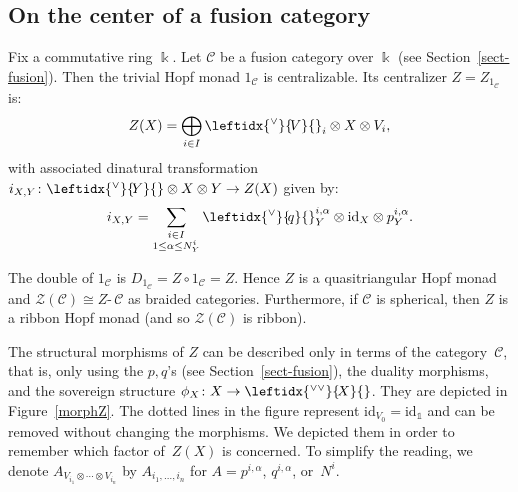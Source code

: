 \documentclass[a4paper]{amsart}
\theoremstyle{definition}
\newcommand{\co}{\colon}
\newcommand{\id}{\mathrm{id}}
\newcommand{\cc}{\mathcal{C}}
\newcommand{\zz}{\mathcal{Z}}
\newcommand{\kk}{\Bbbk}
\newcommand{\ti}{\mbox{-}\,}
\newcommand{\un}{\mathbb{1}}
\newcommand{\ldual}[1]{\leftidx{^\vee}{\!#1}{}}
\newcommand{\lldual}[1]{\leftidx{^{\vee\vee}}{\!#1}{}}
\begin{document}
\subsection{On the center of a fusion category}\label{sect-centerfusion} Fix a commutative ring $\kk$. Let $\cc$ be a fusion
category over $\kk$ (see Section~\ref{sect-fusion}). Then the trivial Hopf monad $1_\cc$ is centralizable. Its centralizer $Z=Z_{1_\cc}$ is:
\begin{equation*}
Z(X)=\bigoplus_{i \in I} \ldual{V}_i \otimes X \otimes V_i,
\end{equation*}
with associated dinatural transformation $i_{X,Y} \co \ldual{Y} \otimes X \otimes Y \to Z(X)$ given by:
\begin{equation*}
i_{X,Y}=\sum_{\substack{i\in I \\ 1 \leq \alpha \leq N_Y^i}} \ldual{q}_Y^{i,\alpha}\otimes \id_X \otimes p_Y^{i,\alpha}.
\end{equation*}

The double of $1_\cc$ is $D_{1_\cc}=Z \circ 1_\cc=Z$. Hence $Z$ is a quasitriangular Hopf monad and $\zz(\cc) \cong Z\ti\cc$
as braided categories. Furthermore, if $\cc$ is spherical, then $Z$ is a ribbon Hopf monad (and so $\zz(\cc)$ is ribbon).

The structural morphisms of $Z$ can be described only in terms of the category~$\cc$, that is, only using the $p,q$'s (see Section~\ref{sect-fusion}), the duality morphisms, and the sovereign structure $\phi_X \co X \to
\lldual{X}$. They are depicted in Figure~\ref{morphZ}. The dotted lines in the figure represent $\id_{V_0}=\id_\un$ and can
be removed without changing the morphisms. We depicted them in order to remember which factor of~$Z(X)$ is concerned. To
simplify the reading, we denote $A_{V_{i_1} \otimes \cdots \otimes V_{i_n}}$ by $A_{i_1, \dots, i_n}$ for $A=p^{i,\alpha}$,
$q^{i,\alpha}$, or~$N^i$.
\end{document}
